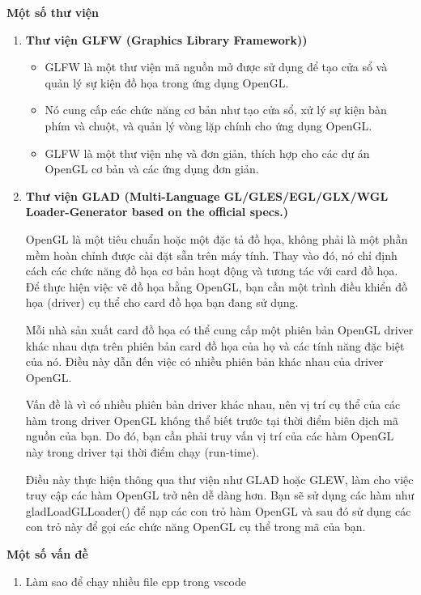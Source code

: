 \textbf{Một số thư viện}
\begin{enumerate}
    \item \textbf{Thư viện GLFW (Graphics Library Framework))} 
        \begin{itemize}
        \item GLFW là một thư viện mã nguồn mở được sử dụng để tạo cửa sổ
        và quản lý sự kiện đồ
        họa trong ứng dụng OpenGL.
        \item
        Nó cung cấp các chức năng cơ bản như tạo cửa sổ,
        xử lý sự kiện bàn phím và chuột, và quản lý vòng lặp chính
        cho ứng dụng OpenGL.
        \item
        GLFW là một thư viện nhẹ và đơn giản, thích hợp cho các dự án OpenGL 
        cơ bản và các ứng dụng đơn giản.
        \end{itemize}

     \item \textbf{Thư viện GLAD (Multi-Language GL/GLES/EGL/GLX/WGL
      Loader-Generator based on the official specs.)}
     
        OpenGL là một tiêu chuẩn hoặc một đặc tả đồ họa, không phải là một 
        phần mềm hoàn chỉnh được cài đặt sẵn trên máy tính. Thay vào đó,
        nó chỉ định cách các chức năng đồ họa cơ bản
        hoạt động và tương tác với card đồ họa. Để thực hiện việc vẽ đồ họa bằng
        OpenGL, bạn cần một trình điều khiển đồ họa (driver) cụ thể cho card đồ 
        họa bạn đang sử dụng.

        Mỗi nhà sản xuất card đồ họa có thể cung cấp một phiên bản OpenGL driver
        khác nhau dựa trên phiên bản card đồ họa của họ và các tính năng đặc biệt của nó. Điều này dẫn 
        đến việc có nhiều phiên bản khác nhau của driver OpenGL.

        Vấn đề là vì có nhiều phiên bản driver khác nhau, nên vị trí cụ thể
        của các hàm trong driver OpenGL không thể biết trước tại thời điểm
        biên dịch mã nguồn của bạn. Do đó, bạn cần phải truy vấn vị trí của 
        các hàm OpenGL này trong driver 
        tại thời điểm chạy (run-time).

        Điều này thực hiện thông qua thư viện như GLAD hoặc GLEW,
        làm cho việc truy cập các hàm OpenGL trở nên dễ dàng hơn.
        Bạn sẽ sử dụng các hàm như gladLoadGLLoader() để nạp các con trỏ
        hàm OpenGL và sau đó sử dụng các con trỏ này để gọi các chức năng
            OpenGL cụ thể trong mã của bạn.
\end{enumerate}

\textbf{Một số vấn đề}
\begin{enumerate}
    \item Làm sao để chạy nhiều file cpp trong vscode 
\end{enumerate}

